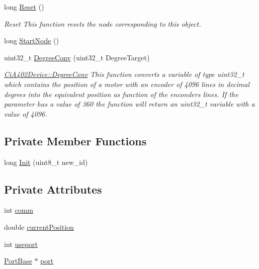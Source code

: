 \begin{DoxyCompactItemize}
\item 
long \hyperlink{classCiA402Device_ac4a6e4987ebe075d0ac07ee5fd4d410c}{Reset} ()
\begin{DoxyCompactList}\small\item\em Reset This function resets the node corresponding to this object. \end{DoxyCompactList}\item 
long \hyperlink{classCiA402Device_a32b4628098364846fe291312025f6fda}{Start\+Node} ()
\item 
uint32\+\_\+t \hyperlink{classCiA402Device_a485eaa3cbd186b6f29caf588c7010023}{Degree\+Conv} (uint32\+\_\+t Degree\+Target)
\begin{DoxyCompactList}\small\item\em \hyperlink{classCiA402Device_a485eaa3cbd186b6f29caf588c7010023}{Ci\+A402\+Device\+::\+Degree\+Conv} This function converts a variable of type uint32\+\_\+t which contains the position of a motor with an encoder of 4096 lines in decimal degrees into the equivalent position as function of the enconders lines. If the parameter has a value of 360 the function will return an uint32\+\_\+t variable with a value of 4096. \end{DoxyCompactList}\end{DoxyCompactItemize}
\subsection*{Private Member Functions}
\begin{DoxyCompactItemize}
\item 
long \hyperlink{classCiA402Device_a622a8884e21d9c4b5ffa0d6c1458ef08}{Init} (uint8\+\_\+t new\+\_\+id)
\end{DoxyCompactItemize}
\subsection*{Private Attributes}
\begin{DoxyCompactItemize}
\item 
int \hyperlink{classCiA402Device_a4e7a5a225fb27f5f02aeb0e6df38cd1f}{comm}
\item 
double \hyperlink{classCiA402Device_adb251ae496aeca707dcc51b43c64d0b8}{current\+Position}
\item 
int \hyperlink{classCiA402Device_a12f2b7115362fe05ee5fc10f70bdbbaa}{useport}
\item 
\hyperlink{classPortBase}{Port\+Base} $\ast$ \hyperlink{classCiA402Device_abc96eb117cc948d86e3bd4c07c7fe807}{port}
\end{DoxyCompactItemize}


